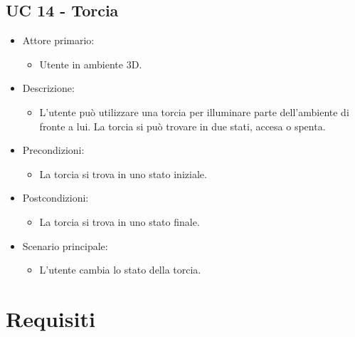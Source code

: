 \subsection{UC 14 - Torcia}
\begin{itemize}

	\item Attore primario: 
	\begin{itemize}
		\item Utente in ambiente 3D.
	\end{itemize}
	\item Descrizione:
	\begin{itemize}
		\item L'utente può utilizzare una torcia per illuminare parte dell'ambiente di fronte a lui. \newline La torcia si può trovare in due stati, accesa o spenta.
	\end{itemize}
	
	\item Precondizioni:
	\begin{itemize}
		\item La torcia si trova in uno stato iniziale.
	\end{itemize}
	
	\item Postcondizioni:
	\begin{itemize}
		\item La torcia si trova in uno stato finale.
	\end{itemize}
	
	\item Scenario principale:
	\begin{itemize}
		\item L'utente cambia lo stato della torcia.
	\end{itemize}
	
\end{itemize}

\pagebreak

\section{Requisiti}

